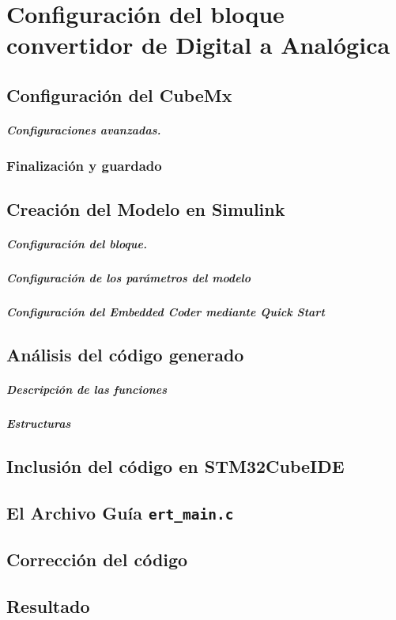 \clearpage

\chapter{Configuración del bloque convertidor de Digital a Analógica}

\section{Configuración del CubeMx}

\paragraph{Configuraciones avanzadas.} 

\subsection{Finalización y guardado}

\section{Creación del Modelo en Simulink}

\paragraph{Configuración del bloque.}

\paragraph{Configuración de los parámetros del modelo}

\paragraph{Configuración del Embedded Coder mediante Quick Start}

\section{Análisis del código generado}

\paragraph{Descripción de las funciones} 

\paragraph{Estructuras}

\section{Inclusión del código en STM32CubeIDE}

\clearpage
\section{El Archivo Guía \texttt{ert\_main.c}}

\section{Corrección del código}

\section{Resultado}